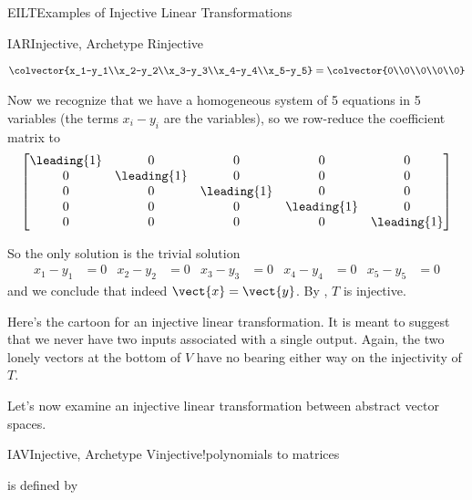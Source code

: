 \begin{subsect}{EILT}{Examples of Injective Linear Transformations}
\begin{example}{IAR}{Injective, Archetype R}{injective}
\begin{para}
\begin{gather*}
\colvector{x_1-y_1\\x_2-y_2\\x_3-y_3\\x_4-y_4\\x_5-y_5}
=
\colvector{0\\0\\0\\0\\0}
\end{gather*}
\end{para}
%
\begin{para}Now we recognize that we have a homogeneous system of 5 equations in 5 variables (the terms $x_i-y_i$ are the variables), so we row-reduce the coefficient matrix to
%
\begin{equation*}
\begin{bmatrix}
\leading{1}&0&0&0&0\\
0&\leading{1}&0&0&0\\
0&0&\leading{1}&0&0\\
0&0&0&\leading{1}&0\\
0&0&0&0&\leading{1}
\end{bmatrix}
\end{equation*}
\end{para}
%
\begin{para}So the only solution is the trivial solution
%
\begin{align*}
x_1-y_1&=0&x_2-y_2&=0&x_3-y_3&=0&x_4-y_4&=0&x_5-y_5&=0
\end{align*}
%
and we conclude that indeed $\vect{x}=\vect{y}$.  By , $T$ is injective.\end{para}
%
\end{example}
%
\begin{para}Here's the cartoon for an injective linear transformation.  It is meant to suggest that we never have two inputs associated with a single output.  Again, the two lonely vectors at the bottom of $V$ have no bearing either way on the injectivity of $T$.%
%
%
\end{para}
%
\begin{para}Let's now examine an injective linear transformation between abstract vector spaces.\end{para}
%
\begin{example}{IAV}{Injective, Archetype V}{injective!polynomials to matrices}
\begin{para} is defined by
%
\begin{equation*}

\end{equation*}
\end{para}
\end{example}
\end{subsect}

